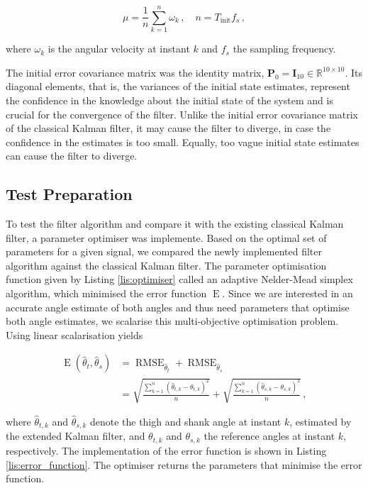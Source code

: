 \begin{equation}
  \mu = \frac{1}{n} \sum_{k=1}^{n}{\omega_k}\,, \quad n = T_{\text{init}} f_s\,,
\end{equation}

\noindent
where $\omega_k$ is the angular velocity at instant $k$ and $f_s$ the sampling frequency.

The initial error covariance matrix was the identity matrix, $\mathbf{P}_0 = \mathbf{I}_{10} \in \mathbb{R}^{10\times10}$. Its diagonal elements, that is, the variances of the initial state estimates, represent the confidence in the knowledge about the initial state of the system and is crucial for the convergence of the filter. Unlike the initial error covariance matrix of the classical Kalman filter, it may cause the filter to diverge, in case the confidence in the estimates is too small. Equally, too vague initial state estimates can cause the filter to diverge.

\subsection{Test Preparation}\label{sec:preparation}

To test the filter algorithm and compare it with the existing classical Kalman filter, a parameter optimiser was implemente. Based on the optimal set of parameters for a given signal, we compared the newly implemented filter algorithm against the classical Kalman filter. The parameter optimisation function given by Listing \ref{lis:optimiser} called an adaptive Nelder-Mead simplex algorithm, which minimised the error function $\operatorname{E}$. Since we are interested in an accurate angle estimate of both angles and thus need parameters that optimise both angle estimates, we scalarise this multi-objective optimisation problem. Using linear scalarisation yields

\begin{equation}
\begin{split}
  \operatorname{E}(\hat{\theta}_t, \hat{\theta}_s) &= \operatorname{RMSE}_{\hat{\theta}_{t}} + \operatorname{RMSE}_{\hat{\theta}_s} \\
  &= \sqrt{\frac{\sum_{k=1}^n (\hat{\theta}_{t, k} - \theta_{t, k})^2}{n}} + \sqrt{\frac{\sum_{k=1}^n (\hat{\theta}_{s, k} - \theta_{s, k})^2}{n}}\,,
\end{split}
\end{equation}

\noindent
where $\hat{\theta}_{t,k}$ and $\hat{\theta}_{s,k}$ denote the thigh and shank angle at instant $k$, estimated by the extended Kalman filter, and $\theta_{t, k}$ and $\theta_{s, k}$ the reference angles at instant $k$, respectively. The implementation of the error function is shown in Listing \ref{lis:error_function}. The optimiser returns the parameters that minimise the error function.

